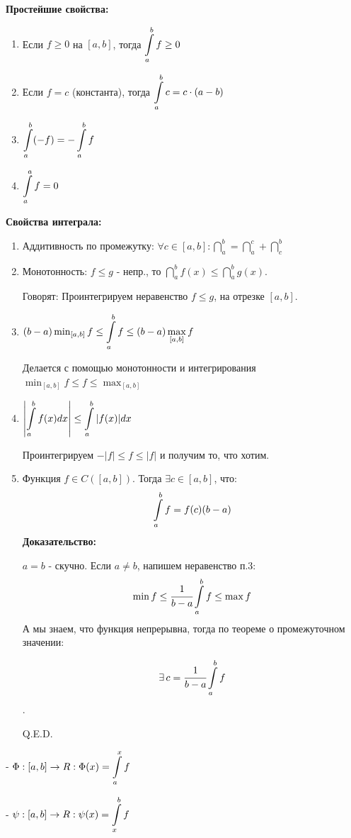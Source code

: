\textbf{Простейшие свойства:}
\begin{enumerate}
    \item Если $f \ge 0$ на $[a, b]$, тогда $\displaystyle\int\limits_{a}^{b}f \ge 0$
    \item Если $f = c$ (константа), тогда $\displaystyle\int\limits_{a}^{b}c = c \cdot (a - b)$
    \item $\displaystyle\int\limits_{a}^{b}(-f) = -\displaystyle\int\limits_{a}^{b}f$
    \item $\displaystyle\int\limits_{a}^{a}f = 0$
\end{enumerate}

\textbf{Свойства интеграла:}
\begin{enumerate}
    \item Аддитивность по промежутку: $\forall c \in [a,b]:\dint\limits_{a}^b =\dint\limits_{a}^c + \dint\limits_{c}^b $
    \item Монотонность: $f\leq g$ - непр., то $\dint\limits_{a}^b f(x)\leq \dint\limits_{a}^b g(x)$. 

    Говорят: Проинтегрируем неравенство $f\leq g$, на отрезке $[a,b]$.

    \item $(b-a)\min_{[a,b]} f \leq\displaystyle\int\limits_{a}^{b}f\leq (b-a)\max_{[a,b]}f$

    Делается с помощью монотонности и интегрирования $\min_{[a,b]}f\leq f\leq\max_{[a,b]}$

    \item $\left|\displaystyle\int\limits_{a}^{b}f(x)dx\right|\leq \displaystyle\int\limits_{a}^{b}|f(x)|dx$

    Проинтегрируем $-|f|\leq f\leq |f|$ и получим то, что хотим.

    \item {}

    Функция $f \in C([a,b])$. Тогда $\exists c \in [a,b]$, что:
    $$\displaystyle\int\limits_{a}^{b}f = f(c)(b-a)$$
    \textbf{Доказательство:} 
    
    $a=b$ - скучно. Если $a\neq b$, напишем неравенство п.3:
    $$\min f\leq \cfrac{1}{b-a}\displaystyle\int\limits_{a}^{b}f\leq \max f$$ А мы знаем, что функция непрерывна, тогда по теореме о промежуточном значении:
    
    $$\exists \, c  = \cfrac{1}{b-a}\displaystyle\int\limits_{a}^{b}f$$. 
    
    \hfill Q.E.D.
\end{enumerate}

 -  $\Phi:[a,b] \rightarrow R: \Phi(x)= \displaystyle\int\limits_{a}^{x}f$

 -  $\psi:[a,b] \rightarrow R: \psi(x)= \displaystyle\int\limits_{x}^{b}f$

